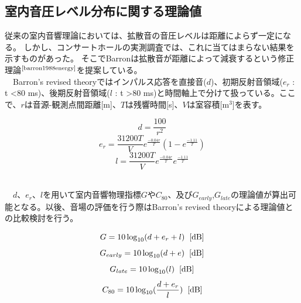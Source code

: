 \subsection{室内音圧レベル分布に関する理論値}
従来の室内音響理論においては、拡散音の音圧レベルは距離によらず一定になる。
しかし、コンサートホールの実測調査では、これに当てはまらない結果を示すものがあった。
そこでBarronは拡散音が距離によって減衰するという修正理論$^{\text{\cite{barron1988energy}}}$を提案している。
\\　Barron's revised theoryではインパルス応答を直接音($d$)、初期反射音領域($e_r$ : t \textless 80 ms)、後期反射音領域($l$ : t \textgreater 80 ms)と時間軸上で分けて扱っている。ここで、$r$は音源-観測点間距離[m]、$T$は残響時間[s]、$V$は室容積[m$^3$]を表す。
\begin{table}[htbp]
    \begin{equation}
        \label{eq:d}
        d=\frac{100}{r^2}
    \end{equation}
    \begin{equation}
        e_r=\frac{31200T}{V}e^{\frac{-0.04r}{T}}(1-e^{\frac{-1.11}{T}})
    \end{equation}
    \begin{equation}
        l=\frac{31200T}{V}e^{\frac{-0.04r}{T}}e^{\frac{-1.11}{T}}
    \end{equation}
\end{table}
\\　$d$、$e_r$、$l$を用いて室内音響物理指標$G$や$C_{80}$、及び$G_{early}$,$G_{late}$の理論値が算出可能となる。以後、音場の評価を行う際はBarron's revised theoryによる理論値との比較検討を行う。
\begin{table}[htbp]
    \begin{equation}
        G=10\log_{10}(d+e_r+l)\hspace{2mm}\textrm{[dB]}
    \end{equation}
    \begin{equation}
        G_{early}=10\log_{10}(d+e)\hspace{2mm}\textrm{[dB]}
    \end{equation}
    \begin{equation}
        G_{late}=10\log_{10}(l)\hspace{2mm}\textrm{[dB]}
    \end{equation}
    \begin{equation}
        C_{80}=10\log_{10}(\frac{d+e_r}{l})\hspace{2mm}\textrm{[dB]}
    \end{equation}

\end{table}